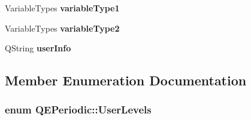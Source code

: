 \begin{DoxyCompactItemize}
\item 
\hypertarget{classQEPeriodic_aebf9fb102e1780ea224773be2499b112}{
VariableTypes {\bfseries variableType1}}
\label{classQEPeriodic_aebf9fb102e1780ea224773be2499b112}

\item 
\hypertarget{classQEPeriodic_a82c7f8938c23e21915bc61dd667cddbf}{
VariableTypes {\bfseries variableType2}}
\label{classQEPeriodic_a82c7f8938c23e21915bc61dd667cddbf}

\item 
\hypertarget{classQEPeriodic_acdf0602aa035f087e34df4fbd0789c8a}{
QString {\bfseries userInfo}}
\label{classQEPeriodic_acdf0602aa035f087e34df4fbd0789c8a}

\end{DoxyCompactItemize}


\subsection{Member Enumeration Documentation}
\hypertarget{classQEPeriodic_a24429d342ac647985717bc5cb6a3d912}{
\subsubsection[{UserLevels}]{\setlength{\rightskip}{0pt plus 5cm}enum {\bf QEPeriodic::UserLevels}}}
\label{classQEPeriodic_a24429d342ac647985717bc5cb6a3d912}
